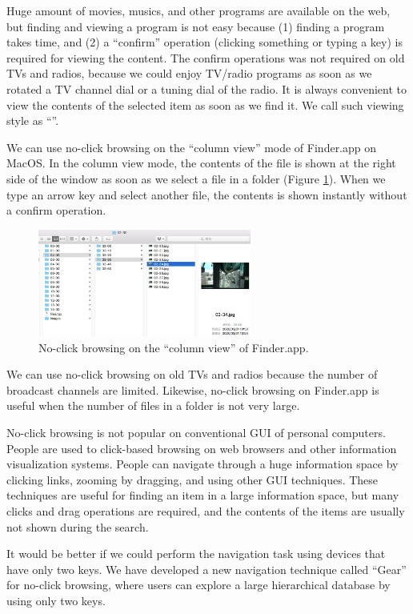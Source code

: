 \documentclass[conference]{IEEEtran}
\begin{document}
Huge amount of movies, musics, and other programs are available on the web, but
finding and viewing a program is not easy because
(1) finding a program takes time, and
(2) a ``confirm'' operation (clicking something or typing a key)
is required for viewing the content.
%
The confirm operations was not required on old TVs and radios,
because we could enjoy TV/radio programs
as soon as we rotated a TV channel dial or a tuning dial of the radio.
%
It is always convenient to view the contents of the selected item
as soon as we find it.
We call such viewing style as ``\textbf{}''.

We can use no-click browsing on the ``column view'' mode of Finder.app on MacOS.
In the column view mode, 
the contents of the file is shown at the right side of the window
as soon as we select a file in a folder (Figure \ref{noclickfinder}).
When we type an arrow key and select another file,
the contents is shown instantly without a confirm operation.

\begin{figure}[H]
  \centerline{\includegraphics[width=70mm,bb=0 0 839 423]{figures/10d7ca6c55aa93ebcdab799246e4c087.jpg}}
  \caption{No-click browsing on the ``column view'' of Finder.app.}
  \label{noclickfinder}
\end{figure}

We can use no-click browsing on old TVs and radios because the number of
broadcast channels are limited.
Likewise, no-click browsing on Finder.app is useful
when the number of files in a folder is not very large.

No-click browsing is not popular on conventional GUI of personal computers.
People are used to click-based browsing on web browsers and other
information visualization systems.
People can navigate through a huge information space by
clicking links, zooming by dragging, and using other GUI techniques.
These techniques are useful for finding an item in a large information space,
but many clicks and drag operations are required,
and the contents of the items are usually not shown during the search.

It would be better
if we could perform the navigation task using devices that have only two keys.
%
We have developed a new navigation technique called ``{Gear}'' for no-click browsing,
where users can explore a large hierarchical database by using only two keys.
\end{document}
